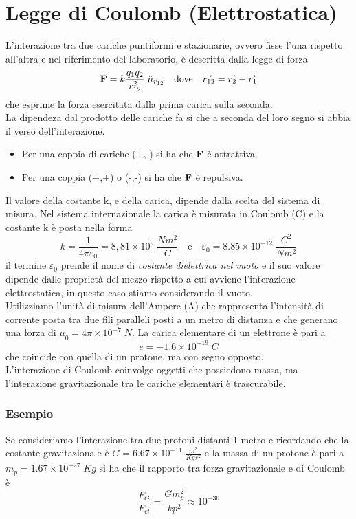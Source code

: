 \section{Legge di Coulomb (Elettrostatica)}

L'interazione tra due cariche puntiformi e stazionarie, ovvero fisse l'una rispetto all'altra e nel riferimento del laboratorio, \`e descritta dalla legge di forza 
\begin{equation}
	\bold{F} = k \frac{q_1q_2}{r_{12}^2} \;\hat{\mu}_{r_{12}} \quad \text{dove} \quad \vec{r_{12}} = \vec{r_2} - \vec{r_1}
\end{equation}
che esprime la forza esercitata dalla prima carica sulla seconda.
\\
La dipendeza dal prodotto delle cariche fa si che a seconda del loro segno si abbia il verso dell'interazione.
\begin{itemize}
	\item Per una coppia di cariche (+,-) si ha che $\bold{F}$ \`e attrattiva. 
	\item Per una coppia (+,+) o (-,-) si ha che $\bold{F}$ \`e repulsiva.  
\end{itemize}
Il valore della costante k, e della carica, dipende dalla scelta del sistema di misura. Nel sistema internazionale la carica \`e misurata in Coulomb (C) e la costante k \`e posta nella forma 
\begin{equation*}
	k = \frac{1}{4 \pi \varepsilon_0} = 8,81 \times 10^9 \;  \frac{N m^2}{C} \quad \text{e} \quad \varepsilon_0 = 8.85 \times 10^{-12} \; \frac{C^2}{Nm^2} 
\end{equation*}
il termine $\varepsilon_0$ prende il nome di \textit{costante dielettrica nel vuoto} e il suo valore dipende dalle propriet\`a del mezzo rispetto a cui avviene l'interazione elettrostatica, in questo caso stiamo considerando il vuoto.
\\ 
Utilizziamo l'unit\`a di misura dell'Ampere (A) che rappresenta l'intensit\`a di corrente posta tra due fili paralleli posti a un metro di distanza e che generano una forza di $\mu_0 = 4 \pi \times 10^{-7} \; N$. La carica elementare di un elettrone \`e pari a 
\begin{equation*}
	e = - 1.6 \times 10^{-19} \;C
\end{equation*}
che coincide con quella di un protone, ma con segno opposto.
\\
L'interazione di Coulomb coinvolge oggetti che possiedono massa, ma l'interazione gravitazionale tra le cariche elementari \`e trascurabile.
\subsubsection{Esempio}
Se consideriamo l'interazione tra due protoni distanti 1 metro e ricordando che la costante gravitazionale \`e $G = 6.67 \times 10^{-11} \; \frac{m^3}{Kgs^2}$ e la massa di un protone \`e pari a $m_p = 1.67 \times 10^{-27} \; Kg $ si ha che il rapporto tra forza gravitazionale e di Coulomb \`e 
\begin{equation*}
\frac{F_G}{F_{el}} = \frac{Gm_p^2}{kp^2} \approx 10^{-36}
\end{equation*}

